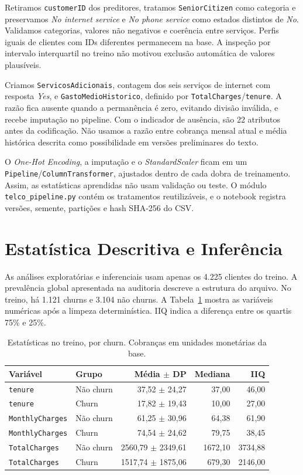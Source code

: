 \documentclass[12pt]{article}
\begin{document}
Retiramos \texttt{customerID} dos preditores, tratamos \texttt{SeniorCitizen} como categoria e preservamos \textit{No internet service} e \textit{No phone service} como estados distintos de \textit{No}. Validamos categorias, valores não negativos e coerência entre serviços. Perfis iguais de clientes com IDs diferentes permanecem na base. A inspeção por intervalo interquartil no treino não motivou exclusão automática de valores plausíveis.

Criamos \texttt{ServicosAdicionais}, contagem dos seis serviços de internet com resposta \textit{Yes}, e \texttt{GastoMedioHistorico}, definido por \texttt{TotalCharges}/\texttt{tenure}. A razão fica ausente quando a permanência é zero, evitando divisão inválida, e recebe imputação no pipeline. Com o indicador de ausência, são 22 atributos antes da codificação. Não usamos a razão entre cobrança mensal atual e média histórica descrita como possibilidade em versões preliminares do texto.

O \textit{One-Hot Encoding}, a imputação e o \textit{StandardScaler} ficam em um \texttt{Pipeline}/\texttt{ColumnTransformer}, ajustados dentro de cada dobra de treinamento. Assim, as estatísticas aprendidas não usam validação ou teste. O módulo \texttt{telco\_pipeline.py} contém os tratamentos reutilizáveis, e o notebook registra versões, semente, partições e hash SHA-256 do CSV.

\section{Estatística Descritiva e Inferência}\label{sec:estatistica}
As análises exploratórias e inferenciais usam apenas os 4.225 clientes do treino. A prevalência global apresentada na auditoria descreve a estrutura do arquivo. No treino, há 1.121 churns e 3.104 não churns. A Tabela~\ref{tab:descritiva} mostra as variáveis numéricas após a limpeza determinística. IIQ indica a diferença entre os quartis 75\% e 25\%.

\begin{table}[htbp]
\centering\small
\caption{Estatísticas no treino, por churn. Cobranças em unidades monetárias da base.}
\label{tab:descritiva}
\begin{tabular}{llrrr}\toprule
Variável & Grupo & Média $\pm$ DP & Mediana & IIQ\\\midrule
\texttt{tenure} & Não churn & 37,52 $\pm$ 24,27 & 37,00 & 46,00 \\
\texttt{tenure} & Churn & 17,82 $\pm$ 19,43 & 10,00 & 27,00 \\
\texttt{MonthlyCharges} & Não churn & 61,25 $\pm$ 30,96 & 64,38 & 61,90 \\
\texttt{MonthlyCharges} & Churn & 74,54 $\pm$ 24,62 & 79,75 & 38,45 \\
\texttt{TotalCharges} & Não churn & 2560,79 $\pm$ 2349,61 & 1672,10 & 3734,88 \\
\texttt{TotalCharges} & Churn & 1517,74 $\pm$ 1875,06 & 679,30 & 2146,00 \\
\bottomrule\end{tabular}
\end{table}
\end{document}
